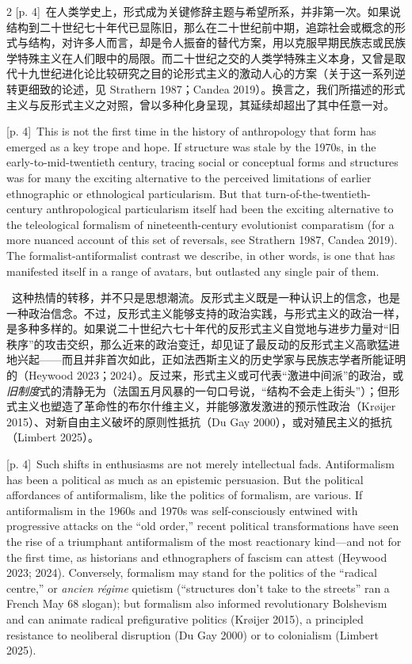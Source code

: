 \documentclass[10pt,a4paper]{article}
\begin{document}
\begin{paracol}{2}
{\scriptsize\color{gray} [p. 4]}\ 在人类学史上，形式成为关键修辞主题与希望所系，并非第一次。如果说结构到二十世纪七十年代已显陈旧，那么在二十世纪前中期，追踪社会或概念的形式与结构，对许多人而言，却是令人振奋的替代方案，用以克服早期民族志或民族学特殊主义在人们眼中的局限。而二十世纪之交的人类学特殊主义本身，又曾是取代十九世纪进化论比较研究之目的论形式主义的激动人心的方案（关于这一系列逆转更细致的论述，见 Strathern 1987；Candea 2019）。换言之，我们所描述的形式主义与反形式主义之对照，曾以多种化身呈现，其延续却超出了其中任意一对。\par
\switchcolumn
{\scriptsize\color{gray} [p. 4]}\ This is not the first time in the history of anthropology that form has emerged as a key trope and hope. If structure was stale by the 1970s, in the early-to-mid-twentieth century, tracing social or conceptual forms and structures was for many the exciting alternative to the perceived limitations of earlier ethnographic or ethnological particularism. But that turn-of-the-twentieth-century anthropological particularism itself had been the exciting alternative to the teleological formalism of nineteenth-century evolutionist comparatism (for a more nuanced account of this set of reversals, see Strathern 1987, Candea 2019). The formalist-antiformalist contrast we describe, in other words, is one that has manifested itself in a range of avatars, but outlasted any single pair of them.\par
\switchcolumn*
{\scriptsize\color{gray} [p. 4]}\ 这种热情的转移，并不只是思想潮流。反形式主义既是一种认识上的信念，也是一种政治信念。不过，反形式主义能够支持的政治实践，与形式主义的政治一样，是多种多样的。如果说二十世纪六七十年代的反形式主义自觉地与进步力量对“旧秩序”的攻击交织，那么近来的政治变迁，却见证了最反动的反形式主义高歌猛进地兴起——而且并非首次如此，正如法西斯主义的历史学家与民族志学者所能证明的（Heywood 2023；2024）。反过来，形式主义或可代表“激进中间派”的政治，或\textit{旧制度}式的清静无为（法国五月风暴的一句口号说，“结构不会走上街头”）；但形式主义也塑造了革命性的布尔什维主义，并能够激发激进的预示性政治（Krøijer 2015）、对新自由主义破坏的原则性抵抗（Du Gay 2000），或对殖民主义的抵抗（Limbert 2025）。\par
\switchcolumn
{\scriptsize\color{gray} [p. 4]}\ Such shifts in enthusiasms are not merely intellectual fads. Antiformalism has been a political as much as an epistemic persuasion. But the political affordances of antiformalism, like the politics of formalism, are various. If antiformalism in the 1960s and 1970s was self-consciously entwined with progressive attacks on the “old order,” recent political transformations have seen the rise of a triumphant antiformalism of the most reactionary kind—and not for the first time, as historians and ethnographers of fascism can attest (Heywood 2023; 2024). Conversely, formalism may stand for the politics of the “radical centre,” or \textit{ancien régime} quietism (“structures don’t take to the streets” ran a French May 68 slogan); but formalism also informed revolutionary Bolshevism and can animate radical prefigurative politics (Krøijer 2015), a principled resistance to neoliberal disruption (Du Gay 2000) or to colonialism (Limbert 2025).\par

\end{paracol}
\end{document}

